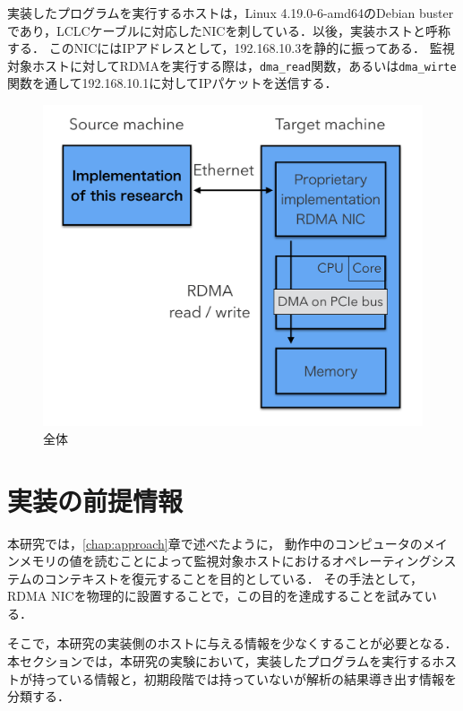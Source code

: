 実装したプログラムを実行するホストは，Linux 4.19.0-6-amd64のDebian busterであり，LCLCケーブルに対応したNICを刺している．以後，実装ホストと呼称する．
このNICにはIPアドレスとして，192.168.10.3を静的に振ってある．
監視対象ホストに対してRDMAを実行する際は，\verb|dma_read|関数，あるいは\verb|dma_wirte|関数を通して192.168.10.1に対してIPパケットを送信する．

\begin{figure}[htbp]
    \caption{全体}
    \label{fig:zentai}
    \begin{center}
        \includegraphics[bb=0 0 1000 800,width=15cm]{img/zentai.png}
    \end{center}
\end{figure}

\section{実装の前提情報}

本研究では，\ref{chap:approach}章で述べたように，
動作中のコンピュータのメインメモリの値を読むことによって監視対象ホストにおけるオペレーティングシステムのコンテキストを復元することを目的としている．
その手法として，RDMA NICを物理的に設置することで，この目的を達成することを試みている．

そこで，本研究の実装側のホストに与える情報を少なくすることが必要となる．
本セクションでは，本研究の実験において，実装したプログラムを実行するホストが持っている情報と，初期段階では持っていないが解析の結果導き出す情報を分類する．

